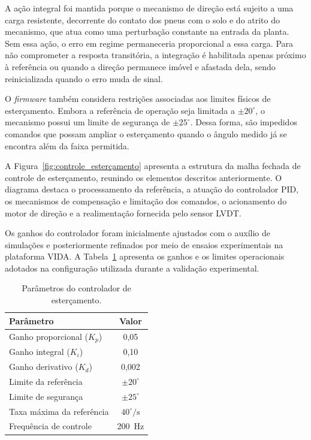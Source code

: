 A ação integral foi mantida porque o mecanismo de direção está sujeito a uma carga resistente, decorrente do contato dos pneus com o solo e do atrito do mecanismo, que atua como uma perturbação constante na entrada da planta. Sem essa ação, o erro em regime permaneceria proporcional a essa carga. Para não comprometer a resposta transitória, a integração é habilitada apenas próximo à referência ou quando a direção permanece imóvel e afastada dela, sendo reinicializada quando o erro muda de sinal.

O \textit{firmware} também considera restrições associadas aos limites físicos de esterçamento. Embora a referência de operação seja limitada a $\pm20^\circ$, o mecanismo possui um limite de segurança de $\pm25^\circ$. Dessa forma, são impedidos comandos que possam ampliar o esterçamento quando o ângulo medido já se encontra além da faixa permitida.

A Figura~\ref{fig:controle_esterçamento} apresenta a estrutura da malha fechada de controle de esterçamento, reunindo os elementos descritos anteriormente. O diagrama destaca o processamento da referência, a atuação do controlador PID, os mecanismos de compensação e limitação dos comandos, o acionamento do motor de direção e a realimentação fornecida pelo sensor LVDT.


Os ganhos do controlador foram inicialmente ajustados com o auxílio de simulações e posteriormente refinados por meio de ensaios experimentais na plataforma VIDA. A Tabela~\ref{tab:parametros_esterçamento} apresenta os ganhos e os limites operacionais adotados na configuração utilizada durante a validação experimental.

\begin{table}[htb]
    \centering
    \caption{Parâmetros do controlador de esterçamento.}
    \label{tab:parametros_esterçamento}
    \begin{tabular}{lc}
        \hline
        \textbf{Parâmetro} & \textbf{Valor} \\
        \hline
        Ganho proporcional ($K_p$) & 0,05 \\
        Ganho integral ($K_i$) & 0,10 \\
        Ganho derivativo ($K_d$) & 0,002 \\
        Limite da referência & $\pm20^\circ$ \\
        Limite de segurança & $\pm25^\circ$ \\
        Taxa máxima da referência & $40^\circ/\mathrm{s}$ \\
        Frequência de controle & 200~Hz \\
        \hline
    \end{tabular}
\end{table}

